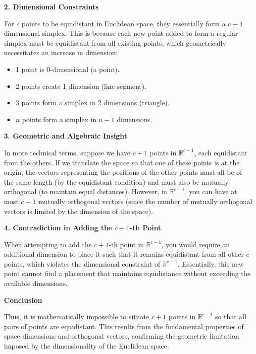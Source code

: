 \documentclass[8pt]{article}
\begin{document}
{\textbf{2. Dimensional Constraints}

For \(c\) points to be equidistant in Euclidean space, they essentially form a \(c-1\) dimensional simplex. This is because each new point added to form a regular simplex must be equidistant from all existing points, which geometrically necessitates an increase in dimension:

\begin{itemize}
    \item 1 point is 0-dimensional (a point).
    \item 2 points create 1 dimension (line segment).
    \item 3 points form a simplex in 2 dimensions (triangle).
    \item \(n\) points form a simplex in \(n-1\) dimensions.
\end{itemize}

\textbf{3. Geometric and Algebraic Insight}

In more technical terms, suppose we have \(c + 1\) points in \(\mathbb{R}^{c-1}\), each equidistant from the others. If we translate the space so that one of these points is at the origin, the vectors representing the positions of the other points must all be of the same length (by the equidistant condition) and must also be mutually orthogonal (to maintain equal distances). However, in \(\mathbb{R}^{c-1}\), you can have at most \(c-1\) mutually orthogonal vectors (since the number of mutually orthogonal vectors is limited by the dimension of the space).

\textbf{4. Contradiction in Adding the \(c+1\)-th Point}

When attempting to add the \(c+1\)-th point in \(\mathbb{R}^{c-1}\), you would require an additional dimension to place it such that it remains equidistant from all other \(c\) points, which violates the dimensional constraint of \(\mathbb{R}^{c-1}\). Essentially, this new point cannot find a placement that maintains equidistance without exceeding the available dimensions.

\textbf{Conclusion}

Thus, it is mathematically impossible to situate \(c+1\) points in \(\mathbb{R}^{c-1}\) so that all pairs of points are equidistant. This results from the fundamental properties of space dimensions and orthogonal vectors, confirming the geometric limitation imposed by the dimensionality of the Euclidean space.

}
\end{document}
